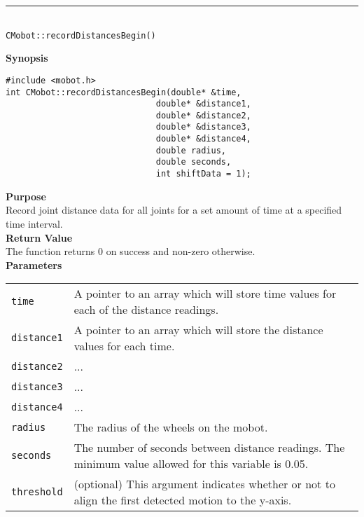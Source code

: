 \noindent
\vspace{5pt}
\rule{4.5in}{0.015in}\\
\noindent
{\LARGE \texttt{CMobot::recordDistancesBegin()}}\\
{}

\noindent
{\bf Synopsis}
\vspace{-8pt}
\begin{verbatim}
#include <mobot.h>
int CMobot::recordDistancesBegin(double* &time, 
                              double* &distance1, 
                              double* &distance2, 
                              double* &distance3, 
                              double* &distance4, 
                              double radius,
                              double seconds,
                              int shiftData = 1);
\end{verbatim}

\noindent
{\bf Purpose}\\
Record joint distance data for all joints for a set amount of time at a specified time interval.\\

\noindent
{\bf Return Value}\\
The function returns 0 on success and non-zero otherwise.\\

\noindent
{\bf Parameters}\\
\vspace{-0.1in}
\begin{description}
\item               
\begin{tabular}{p{15 mm}p{145 mm}}
\texttt{time} & A pointer to an array which will store time values for each of the distance readings. \\
\texttt{distance1} & A pointer to an array which will store the distance values for each time. \\
\texttt{distance2} & ... \\
\texttt{distance3} & ... \\
\texttt{distance4} & ... \\
\texttt{radius} & The radius of the wheels on the mobot. \\
\texttt{seconds} & The number of seconds between distance readings. The minimum value allowed for
this variable is 0.05. \\
\texttt{threshold} & (optional) This argument indicates whether or not to align the first
detected motion to the y-axis. 
\end{tabular}
\end{description}

